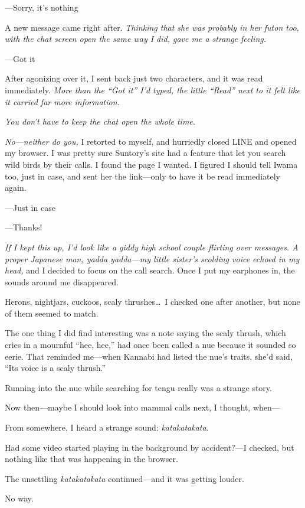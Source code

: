 \documentclass[
    a4paper,
    12pt,
    twoside,
    openany,
    UTF8,
    fontset=windows
]{ctexbook}
\begin{document}
---Sorry, it's nothing

A new message came right after. \textit{Thinking that she was probably in her futon too, with the chat screen open the same way I did, gave me a strange feeling.}

---Got it

After agonizing over it, I sent back just two characters, and it was read immediately. \textit{More than the ``Got it'' I'd typed, the little ``Read'' next to it felt like it carried far more information.}

\textit{You don't have to keep the chat open the whole time.}

\textit{No---neither do you,} I retorted to myself, and hurriedly closed LINE and opened my browser. I was pretty sure Suntory's site had a feature that let you search wild birds by their calls. I found the page I wanted. I figured I should tell Iwama too, just in case, and sent her the link---only to have it be read immediately again.

---Just in case

---Thanks!

\textit{If I kept this up, I'd look like a giddy high school couple flirting over messages. A proper Japanese man, yadda yadda---my little sister's scolding voice echoed in my head,} and I decided to focus on the call search. Once I put my earphones in, the sounds around me disappeared.

Herons, nightjars, cuckoos, scaly thrushes\dots\ I checked one after another, but none of them seemed to match.

The one thing I did find interesting was a note saying the scaly thrush, which cries in a mournful ``hee, hee,'' had once been called a nue because it sounded so eerie. That reminded me---when Kannabi had listed the nue's traits, she'd said, ``Its voice is a scaly thrush.''

Running into the nue while searching for tengu really was a strange story.

Now then---maybe I should look into mammal calls next, I thought, when---

From somewhere, I heard a strange sound: \textit{katakatakata}.

Had some video started playing in the background by accident?---I checked, but nothing like that was happening in the browser.

The unsettling \textit{katakatakata} continued---and it was getting louder.

No way.
\end{document}
